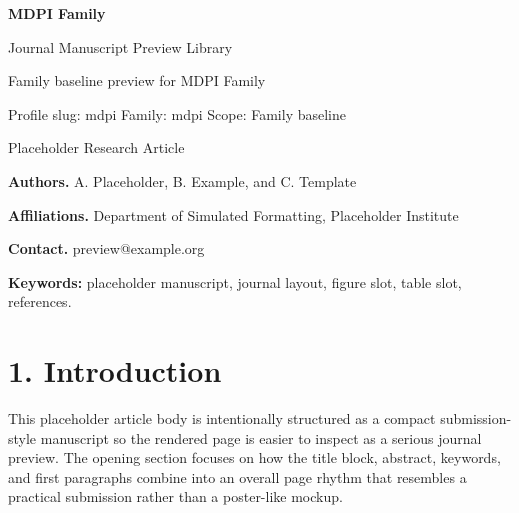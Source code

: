 \documentclass[10pt,a4paper]{article}
\begin{document}
\begin{center}
{\LARGE\bfseries MDPI Family}\par
\vspace{0.25em}
{\small Journal Manuscript Preview Library}\par
\vspace{0.15em}
{\footnotesize Family baseline preview for MDPI Family}\par
\vspace{0.2em}
{\footnotesize Profile slug: mdpi \quad Family: mdpi \quad Scope: Family baseline}
\end{center}
\vspace{0.2em}
 Placeholder Research Article\par\vspace{0.4em}


\noindent\textbf{Authors.} A. Placeholder, B. Example, and C. Template\par
\noindent\textbf{Affiliations.} Department of Simulated Formatting, Placeholder Institute\par
\noindent\textbf{Contact.} preview@example.org\par
\vspace{0.4em}
\par\vspace{0.6em}
\noindent\textbf{Keywords:} placeholder manuscript, journal layout, figure slot, table slot, references.\par\vspace{0.6em}


\small
\section*{1. Introduction}
This placeholder article body is intentionally structured as a compact submission-style manuscript so the rendered page is easier to inspect as a serious journal preview. The opening section focuses on how the title block, abstract, keywords, and first paragraphs combine into an overall page rhythm that resembles a practical submission rather than a poster-like mockup.
\end{document}
